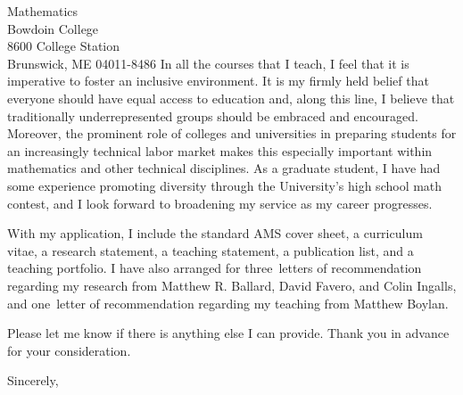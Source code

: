 \documentclass[10pt]{letter}
\def\materials{the standard AMS cover sheet,
  a curriculum vitae,
  a research statement,
  a teaching statement,
  a publication list,
  and a teaching portfolio}
\def\contacts{Manuel Reyes}
\def\numresrefs{three}
\def\numteachrefs{one}
\def\refs{Matthew R. Ballard, David Favero, and Colin Ingalls}
\def\teachingrefs{Matthew Boylan}
\begin{document}
\begin{letter}{
    Mathematics\\
    Bowdoin College\\
    8600 College Station\\
    Brunswick, ME 04011-8486
}
  In all the courses that I teach, I feel that it is imperative to foster an inclusive environment.
  It is my firmly held belief that everyone should have equal access to education and, along this line, I believe that traditionally underrepresented groups should be embraced and encouraged.
  Moreover, the prominent role of colleges and universities in preparing students for an increasingly technical labor market makes this especially important within mathematics and other technical disciplines.
  As a graduate student, I have had some experience promoting diversity through the University's high school math contest, and I look forward to broadening my service as my career progresses.
  


  With my application, I include \materials.
  I have also arranged for \numresrefs\  letters of recommendation regarding my research from \refs, and \numteachrefs\ letter of recommendation regarding my teaching from \teachingrefs.

  
  Please let me know if there is anything else I can provide.
  Thank you in advance for your consideration.
  \closing{Sincerely,}
\end{letter}
\end{document}
